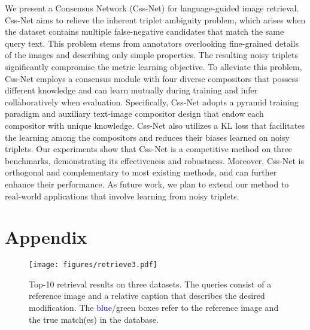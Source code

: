 \documentclass[sigconf]{acmart}
\begin{document}
We present a Consensus Network (Css-Net) for language-guided image retrieval. Css-Net aims to relieve the inherent triplet ambiguity problem, which arises when the dataset contains multiple false-negative candidates that match the same query text. This problem stems from annotators overlooking fine-grained details of the images and describing only simple properties. The resulting noisy triplets significantly compromise the metric learning objective. To alleviate this problem, Css-Net employs a consensus module with four diverse compositors that possess different knowledge and can learn mutually during training and infer collaboratively when evaluation. Specifically, Css-Net adopts a pyramid training paradigm and auxiliary text-image compositor design that endow each compositor with unique knowledge. Css-Net also utilizes a KL loss that facilitates the learning among the compositors and reduces their biases learned on noisy triplets. Our experiments show that Css-Net is a competitive method on three benchmarks, demonstrating its effectiveness and robustness. Moreover, Css-Net is orthogonal and complementary to most existing methods, and can further enhance their performance. As future work, we plan to extend our method to real-world applications that involve learning from noisy triplets.


{\small


}

\clearpage
\appendix
\section*{Appendix}
\setcounter{section}{0}
\renewcommand\thesection{\Alph{section}}
\begin{figure*}
    \centering
    \vspace{-.15in}
    \texttt{[image: figures/retrieve3.pdf]}
    \vspace{-.15in}
    \caption{Top-10 retrieval results on three datasets. The queries consist of a reference image and a relative caption that describes the desired modification. The \textcolor{blue}{blue}/\textcolor{green!70!black}{green} boxes refer to the reference image and the true match(es) in the database.}
    \label{fig:top10}
\end{figure*}
\end{document}
